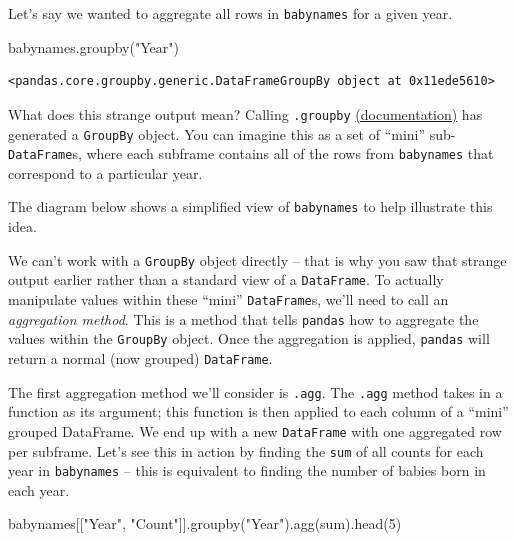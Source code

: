 \documentclass[
  letterpaper,
  DIV=11,
  numbers=noendperiod]{scrreprt}
\newenvironment{Shaded}{\begin{snugshade}}{\end{snugshade}}
\newcommand{\BuiltInTok}[1]{\textcolor[rgb]{0.00,0.23,0.31}{#1}}
\newcommand{\DecValTok}[1]{\textcolor[rgb]{0.68,0.00,0.00}{#1}}
\newcommand{\NormalTok}[1]{\textcolor[rgb]{0.00,0.23,0.31}{#1}}
\newcommand{\StringTok}[1]{\textcolor[rgb]{0.13,0.47,0.30}{#1}}
\begin{document}
Let's say we wanted to aggregate all rows in \texttt{babynames} for a
given year.

\begin{Shaded}
\begin{Highlighting}[]
\NormalTok{babynames.groupby(}\StringTok{"Year"}\NormalTok{)}
\end{Highlighting}
\end{Shaded}

\begin{verbatim}
<pandas.core.groupby.generic.DataFrameGroupBy object at 0x11ede5610>
\end{verbatim}

What does this strange output mean? Calling \texttt{.groupby}
\href{https://pandas.pydata.org/pandas-docs/stable/reference/api/pandas.DataFrame.groupby.html}{(documentation)}
has generated a \texttt{GroupBy} object. You can imagine this as a set
of ``mini'' sub-\texttt{DataFrame}s, where each subframe contains all of
the rows from \texttt{babynames} that correspond to a particular year.

The diagram below shows a simplified view of \texttt{babynames} to help
illustrate this idea.

We can't work with a \texttt{GroupBy} object directly -- that is why you
saw that strange output earlier rather than a standard view of a
\texttt{DataFrame}. To actually manipulate values within these ``mini''
\texttt{DataFrame}s, we'll need to call an \emph{aggregation method}.
This is a method that tells \texttt{pandas} how to aggregate the values
within the \texttt{GroupBy} object. Once the aggregation is applied,
\texttt{pandas} will return a normal (now grouped) \texttt{DataFrame}.

The first aggregation method we'll consider is \texttt{.agg}. The
\texttt{.agg} method takes in a function as its argument; this function
is then applied to each column of a ``mini'' grouped DataFrame. We end
up with a new \texttt{DataFrame} with one aggregated row per subframe.
Let's see this in action by finding the \texttt{sum} of all counts for
each year in \texttt{babynames} -- this is equivalent to finding the
number of babies born in each year.

\begin{Shaded}
\begin{Highlighting}[]
\NormalTok{babynames[[}\StringTok{"Year"}\NormalTok{, }\StringTok{"Count"}\NormalTok{]].groupby(}\StringTok{"Year"}\NormalTok{).agg(}\BuiltInTok{sum}\NormalTok{).head(}\DecValTok{5}\NormalTok{)}
\end{Highlighting}
\end{Shaded}
\end{document}
